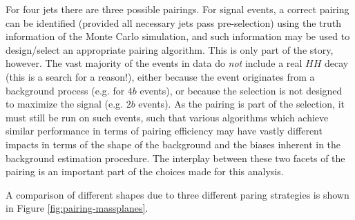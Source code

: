 For four jets there are three possible pairings. For signal events, a correct pairing can be identified
(provided all necessary jets pass pre-selection) using the truth information of the Monte Carlo simulation, 
and such information may be used to design/select an appropriate pairing algorithm. This is only part of 
the story, however. The vast majority of the events in data do \emph{not} include a real $HH$ decay (this is 
a search for a reason!), either because the event originates from a background process (e.g. for $4b$ events), or 
because the selection is not designed to maximize the signal (e.g. $2b$ events). As the pairing is 
part of the selection, it must still be run on such events, such that various algorithms which achieve similar
performance in terms of pairing efficiency may have vastly different impacts in terms of the shape of the background
and the biases inherent in the background estimation procedure. The interplay between these two facets of the 
pairing is an important part of the choices made for this analysis.

A comparison of different shapes due to three different paring strategies is shown in
Figure \ref{fig:pairing-massplanes}.


